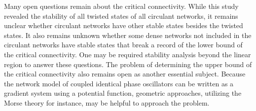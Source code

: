 Many open questions remain about the critical connectivity. While this study revealed the stability of all twisted states of all circulant networks, it remains unclear whether circulant networks have other stable states besides the twisted states. It also remains unknown whether some dense networks not included in the circulant networks have stable states that break a record of the lower bound of the critical connectivity. One may be required stability analysis beyond the linear region to answer these questions. The problem of determining the upper bound of the critical connectivity also remains open as another essential subject. Because the network model of coupled identical phase oscillators can be written as a gradient system using a potential function, geometric approaches, utilizing the Morse theory\cite{matsumoto2002} for instance, may be helpful to approach the problem.
